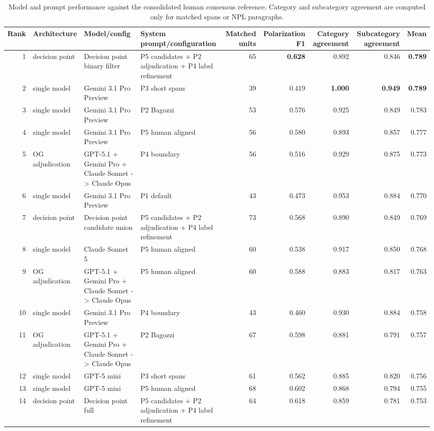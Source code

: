 \begin{table}[t]
\centering
\caption{Model and prompt performance against the consolidated human consensus reference. Category and subcategory agreement are computed only for matched spans or NPL paragraphs.}
\label{tab:model\_prompt\_performance}
\small
\begin{tabular}{rlllrrrrr}
\toprule
Rank & Architecture & Model/config & System prompt/configuration & Matched units & Polarization F1 & Category agreement & Subcategory agreement & Mean \\
\midrule
1 & decision point & Decision point binary filter & P5 candidates + P2 adjudication + P4 label refinement & 65 & \textbf{0.628} & 0.892 & 0.846 & \textbf{0.789} \\
2 & single model & Gemini 3.1 Pro Preview & P3 short spans & 39 & 0.419 & \textbf{1.000} & \textbf{0.949} & \textbf{0.789} \\
3 & single model & Gemini 3.1 Pro Preview & P2 Bagozzi & 53 & 0.576 & 0.925 & 0.849 & 0.783 \\
4 & single model & Gemini 3.1 Pro Preview & P5 human aligned & 56 & 0.580 & 0.893 & 0.857 & 0.777 \\
5 & OG adjudication & GPT-5.1 + Gemini Pro + Claude Sonnet -> Claude Opus & P4 boundary & 56 & 0.516 & 0.929 & 0.875 & 0.773 \\
6 & single model & Gemini 3.1 Pro Preview & P1 default & 43 & 0.473 & 0.953 & 0.884 & 0.770 \\
7 & decision point & Decision point candidate union & P5 candidates + P2 adjudication + P4 label refinement & 73 & 0.568 & 0.890 & 0.849 & 0.769 \\
8 & single model & Claude Sonnet 5 & P5 human aligned & 60 & 0.538 & 0.917 & 0.850 & 0.768 \\
9 & OG adjudication & GPT-5.1 + Gemini Pro + Claude Sonnet -> Claude Opus & P5 human aligned & 60 & 0.588 & 0.883 & 0.817 & 0.763 \\
10 & single model & Gemini 3.1 Pro Preview & P4 boundary & 43 & 0.460 & 0.930 & 0.884 & 0.758 \\
11 & OG adjudication & GPT-5.1 + Gemini Pro + Claude Sonnet -> Claude Opus & P2 Bagozzi & 67 & 0.598 & 0.881 & 0.791 & 0.757 \\
12 & single model & GPT-5 mini & P3 short spans & 61 & 0.562 & 0.885 & 0.820 & 0.756 \\
13 & single model & GPT-5 mini & P5 human aligned & 68 & 0.602 & 0.868 & 0.794 & 0.755 \\
14 & decision point & Decision point full & P5 candidates + P2 adjudication + P4 label refinement & 64 & 0.618 & 0.859 & 0.781 & 0.753 \\

\end{tabular}
\end{table}
